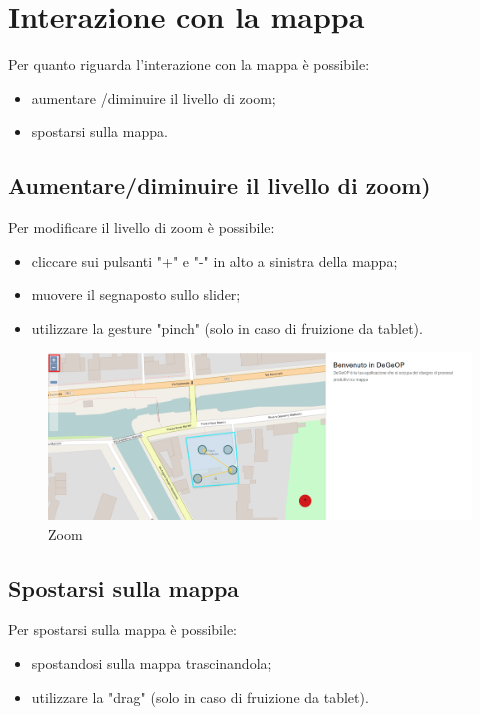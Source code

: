 \section{Interazione con la mappa}
Per quanto riguarda l'interazione con la mappa è possibile:
\begin{itemize}
	\item aumentare /diminuire il livello di zoom;
	\item spostarsi sulla mappa.
\end{itemize}

\subsection{Aumentare/diminuire il livello di zoom)}
Per modificare il livello di zoom è possibile:
\begin{itemize}
	\item cliccare sui pulsanti "+" e "-" in alto a sinistra della mappa;
	\item muovere il segnaposto sullo slider;
	\item utilizzare la gesture "pinch" (solo in caso di fruizione da tablet).
\end{itemize}

\begin{figure}[H]
\centering
\includegraphics[width=\textwidth]{img/zoom.png}
\caption{Zoom}
\end{figure}

\subsection{Spostarsi sulla mappa}
Per spostarsi sulla mappa è possibile:
\begin{itemize}
	\item spostandosi sulla mappa trascinandola;
	\item utilizzare la  "drag" (solo in caso di fruizione da tablet).
\end{itemize}